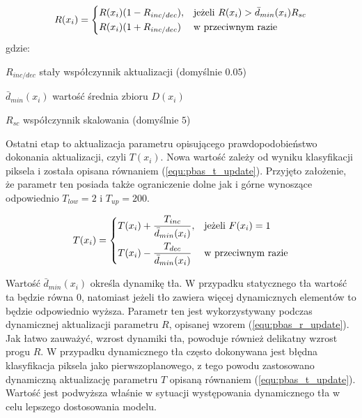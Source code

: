     \begin{equation}
	    R(x_i) = 
		\begin{dcases}
    		R(x_i)(1-R_{inc/dec}), & \text{jeżeli } R(x_i) > \bar{d}_{min}(x_i)R_{sc} \\
    		R(x_i)(1+R_{inc/dec}) & \text{w przeciwnym razie} 
		\end{dcases}
	\label{equ:pbas_r_update}	
	\end{equation}
gdzie:
\begin{eqwhere}[2.2cm]
	\item[$R_{inc/dec}$] stały współczynnik aktualizacji (domyślnie $0.05$)
	\item[$\bar{d}_{min}(x_i)$] wartość średnia zbioru $D(x_i)$
	\item[$R_{sc}$] współczynnik skalowania (domyślnie $5$)
\end{eqwhere}

Ostatni etap to aktualizacja parametru opisującego prawdopodobieństwo dokonania aktualizacji, czyli $T(x_i)$. 
Nowa wartość zależy od wyniku klasyfikacji piksela i została opisana równaniem (\ref{equ:pbas_t_update}). 
Przyjęto założenie, że parametr ten posiada także ograniczenie dolne jak i górne wynoszące odpowiednio $T_{low}=2$ i $T_{up}=200$.  

    \begin{equation}
	    T(x_i) = 
		\begin{dcases}
    		T(x_i) + \frac{T_{inc}}{\bar{d}_{min}(x_i)}, & \text{jeżeli } F(x_i)=1 \\
    		T(x_i) - \frac{T_{dec}}{\bar{d}_{min}(x_i)} & \text{w przeciwnym razie} 
		\end{dcases}
	\label{equ:pbas_t_update}	
	\end{equation}

Wartość $\bar{d}_{min}(x_i)$ określa dynamikę tła. W przypadku statycznego tła wartość ta będzie równa 0, natomiast jeżeli tło zawiera więcej dynamicznych elementów to będzie odpowiednio wyższa. Parametr ten jest wykorzystywany podczas dynamicznej aktualizacji parametru $R$, opisanej wzorem (\ref{equ:pbas_r_update}). Jak łatwo zauważyć, wzrost dynamiki tła, powoduje również delikatny wzrost progu $R$. W przypadku dynamicznego tła często dokonywana jest błędna klasyfikacja piksela jako pierwszoplanowego, z tego powodu zastosowano dynamiczną aktualizację parametru $T$ opisaną równaniem (\ref{equ:pbas_t_update}). Wartość jest podwyższa właśnie w sytuacji występowania dynamicznego tła w celu lepszego dostosowania modelu.

